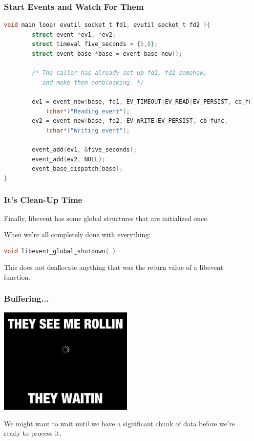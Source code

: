 \begin{frame}[fragile]
\frametitle{Start Events and Watch For Them}
\begin{lstlisting}[language=C]
void main_loop( evutil_socket_t fd1, evutil_socket_t fd2 ){
        struct event *ev1, *ev2;
        struct timeval five_seconds = {5,0};
        struct event_base *base = event_base_new();

        /* The caller has already set up fd1, fd2 somehow, 
           and make them nonblocking. */

        ev1 = event_new(base, fd1, EV_TIMEOUT|EV_READ|EV_PERSIST, cb_func,
            (char*)"Reading event");
        ev2 = event_new(base, fd2, EV_WRITE|EV_PERSIST, cb_func, 
            (char*)"Writing event");

        event_add(ev1, &five_seconds);
        event_add(ev2, NULL);
        event_base_dispatch(base);
}
\end{lstlisting} 

\end{frame}


\begin{frame}[fragile]
\frametitle{It's Clean-Up Time}

Finally, libevent has some global structures that are initialized once. 

When we're all completely done with everything:

\begin{lstlisting}[language=C]
void libevent_global_shutdown( )
\end{lstlisting}

This does not deallocate anything that was the return value of a libevent function.

\end{frame}



\begin{frame}
\frametitle{Buffering...}

\begin{center}
	\includegraphics[width=0.5\textwidth]{images/buffering.jpeg}
\end{center}


We might want to wait until we have a significant chunk of data before we're ready to process it.

\end{frame}


